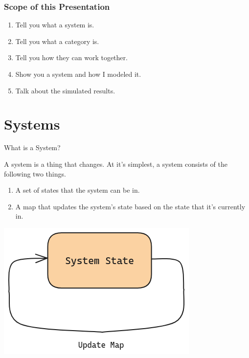\documentclass{beamer}
\begin{document}
\begin{frame}
    \frametitle{Scope of this Presentation}
    \begin{large}
        \begin{enumerate}
            \item Tell you what a system is.
            \item Tell you what a category is.
            \item Tell you how they can work together.
            \item Show you a system and how I modeled it.
            \item Talk about the simulated results.
        \end{enumerate}
    \end{large}

\end{frame}



\section{Systems}


\begin{frame}{What is a System?}
    \begin{large}
        A system is a thing that changes. At it's simplest, a system consists of the following two things.

        \begin{enumerate}
            \item A set of states that the system can be in.
            \item A map that updates the system's state based on the state that it's currently in.
        \end{enumerate}
    \end{large}


    \begin{center}
        \includegraphics[scale=0.35]{system_diagram_closed.png}
    \end{center}

\end{frame}
\end{document}
